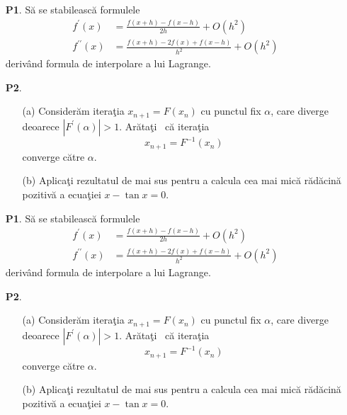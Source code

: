 \documentclass{article}%
\begin{document}
\begin{enumerate}
\item[\textbf{P1}.] S\u{a} se stabileasc\u{a} formulele%
\begin{align*}
f^{\prime}(x)  &  =\frac{f(x+h)-f(x-h)}{2h}+O(h^{2})\\
f^{\prime\prime}(x)  &  =\frac{f(x+h)-2f(x)+f(x-h)}{h^{2}}+O(h^{2})
\end{align*}
deriv\^{a}nd formula de interpolare a lui Lagrange.

\item[\textbf{P2}.] 

\begin{enumerate}
\item[(a)] Consider\u{a}m itera\c{t}ia $x_{n+1}=F(x_{n})$ cu punctul fix
$\alpha$, care diverge deoarece $|F^{\prime}(\alpha)|>1$. Ar\u{a}ta\c{t}i
\ c\u{a} itera\c{t}ia%
\[
x_{n+1}=F^{-1}(x_{n})
\]
converge c\u{a}tre $\alpha$.

\item[(b)] Aplica\c{t}i rezultatul de mai sus pentru a calcula cea mai
mic\u{a} r\u{a}d\u{a}cin\u{a} pozitiv\u{a} a ecua\c{t}iei $x-\tan x=0.$
\end{enumerate}
\end{enumerate}

\bigskip\vspace{3cm}

\begin{enumerate}
\item[\textbf{P1}.] S\u{a} se stabileasc\u{a} formulele%
\begin{align*}
f^{\prime}(x)  &  =\frac{f(x+h)-f(x-h)}{2h}+O(h^{2})\\
f^{\prime\prime}(x)  &  =\frac{f(x+h)-2f(x)+f(x-h)}{h^{2}}+O(h^{2})
\end{align*}
deriv\^{a}nd formula de interpolare a lui Lagrange.

\item[\textbf{P2}.] 

\begin{enumerate}
\item[(a)] Consider\u{a}m itera\c{t}ia $x_{n+1}=F(x_{n})$ cu punctul fix
$\alpha$, care diverge deoarece $|F^{\prime}(\alpha)|>1$. Ar\u{a}ta\c{t}i
\ c\u{a} itera\c{t}ia%
\[
x_{n+1}=F^{-1}(x_{n})
\]
converge c\u{a}tre $\alpha$.

\item[(b)] Aplica\c{t}i rezultatul de mai sus pentru a calcula cea mai
mic\u{a} r\u{a}d\u{a}cin\u{a} pozitiv\u{a} a ecua\c{t}iei $x-\tan x=0.$
\end{enumerate}
\end{enumerate}
\end{document}
